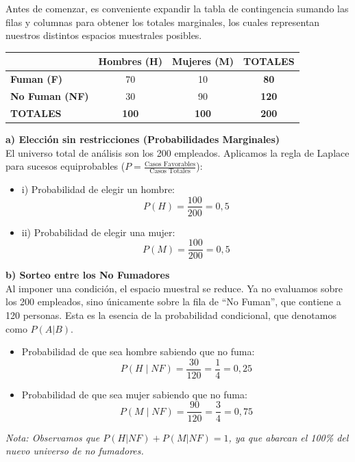 \documentclass[11pt,a4paper]{article}
\begin{document}
Antes de comenzar, es conveniente expandir la tabla de contingencia sumando las filas y columnas para obtener los totales marginales, los cuales representan nuestros distintos espacios muestrales posibles.

\begin{center}
\begin{tabular}{lccc}
\toprule
 & \textbf{Hombres (H)} & \textbf{Mujeres (M)} & \textbf{TOTALES} \\
\midrule
\textbf{Fuman (F)} & 70 & 10 & \textbf{80} \\
\textbf{No Fuman (NF)} & 30 & 90 & \textbf{120} \\
\midrule
\textbf{TOTALES} & \textbf{100} & \textbf{100} & \textbf{200} \\
\bottomrule
\end{tabular}
\end{center}

\vspace{0.3cm}
\noindent \textbf{a) Elección sin restricciones (Probabilidades Marginales)} \\
El universo total de análisis son los 200 empleados. Aplicamos la regla de Laplace para sucesos equiprobables ($P = \frac{\text{Casos Favorables}}{\text{Casos Totales}}$):
\begin{itemize}
    \item i) Probabilidad de elegir un hombre:
    $$ P(H) = \frac{100}{200} = 0,5 $$
    \item ii) Probabilidad de elegir una mujer:
    $$ P(M) = \frac{100}{200} = 0,5 $$
\end{itemize}

\vspace{0.3cm}
\noindent \textbf{b) Sorteo entre los No Fumadores} \\
Al imponer una condición, el espacio muestral se reduce. Ya no evaluamos sobre los 200 empleados, sino únicamente sobre la fila de ``No Fuman'', que contiene a 120 personas. Esta es la esencia de la probabilidad condicional, que denotamos como $P(A|B)$.
\begin{itemize}
    \item Probabilidad de que sea hombre sabiendo que no fuma:
    $$ P(H \mid NF) = \frac{30}{120} = \frac{1}{4} = 0,25 $$
    \item Probabilidad de que sea mujer sabiendo que no fuma:
    $$ P(M \mid NF) = \frac{90}{120} = \frac{3}{4} = 0,75 $$
\end{itemize}
\textit{Nota: Observamos que $P(H|NF) + P(M|NF) = 1$, ya que abarcan el 100\% del nuevo universo de no fumadores.}
\end{document}
